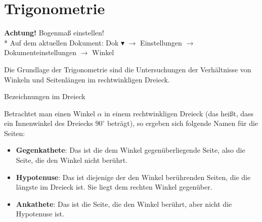 \clearpage

\section{Trigonometrie}
\begin{marginfigure}
  \begin{tcolorbox}[colback=white!95!black,colframe=white!75!black,title=CAS:,arc=0mm]
    \begin{scriptsize}
      \textbf{Achtung!} Bogenmaß einstellen! \\*
      Auf dem aktuellen Dokument: Dok \( \blacktriangledown \) \( \to \) Einstellungen \( \to \) Dokumenteinstellungen \( \to \) Winkel
    \end{scriptsize}
  \end{tcolorbox}
\end{marginfigure}
Die Grundlage der Trigonometrie sind die Untersuchungen der Verhältnisse von Winkeln und Seitenlängen im rechtwinkligen Dreieck.

\begin{bla}{Bezeichnungen im Dreieck}
  \begin{marginfigure}
    \caption{Ein rechtwinkliges Dreieck und die Seitenbezeichnungen für den betrachteten Winkel.}
  \end{marginfigure}

  Betrachtet man einen Winkel $\alpha$ in einem rechtwinkligen Dreieck (das heißt, dass ein Innenwinkel des Dreiecks $90^{\circ}$ beträgt), so ergeben sich folgende Namen für die Seiten:
  \begin{itemize}
    \item \textbf{Gegenkathete}: Das ist die dem Winkel gegenüberliegende Seite, also die Seite, die den Winkel nicht berührt.
    \item \textbf{Hypotenuse}: Das ist diejenige der den Winkel berührenden Seiten, die die  längste im Dreieck ist. Sie liegt dem rechten Winkel gegenüber.
    \item \textbf{Ankathete}: Das ist die Seite, die den Winkel berührt, aber nicht die Hypotenuse ist.
  \end{itemize}
\end{bla}

